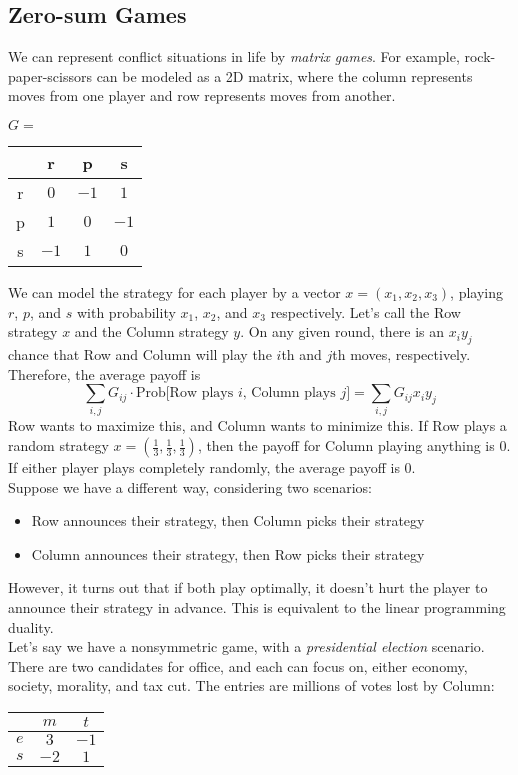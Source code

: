 \subsection{Zero-sum Games}
We can represent conflict situations in life by \textit{matrix games}.
For example, rock-paper-scissors can be modeled as a 2D matrix, where the column represents moves from one player and row represents moves from another.
\begin{center}
$G = $\begin{tabular}{c | c c c}
  & r & p & s \\
  \hline
  r & $0$ & $-1$ & $1$ \\
  p & $1$ & $0$ & $-1$\\
  s & $-1$ & $1$ & $0$
\end{tabular}
\end{center}
We can model the strategy for each player by a vector $x = (x_1, x_2, x_3)$, playing $r$, $p$, and $s$ with probability $x_{1}$, $x_{2}$, and $x_{3}$ respectively.
Let's call the Row strategy $x$ and the Column strategy $y$.
On any given round, there is an $x_i y_j$ chance that Row and Column will play the $i$th and $j$th moves, respectively.
Therefore, the average payoff is $$\sum_{i, j} G_{ij} \cdot \text{Prob[Row plays $i$, Column plays $j$]} = \sum_{i,j} G_{ij} x_i y_j$$
Row wants to maximize this, and Column wants to minimize this.
If Row plays a random strategy $x = (\frac{1}{3}, \frac{1}{3}, \frac{1}{3})$, then the payoff for Column playing anything is $0$.
If either player plays completely randomly, the average payoff is $0$.\\
Suppose we have a different way, considering two scenarios:
\begin{itemize}
  \item Row announces their strategy, then Column picks their strategy
  \item Column announces their strategy, then Row picks their strategy
\end{itemize}
However, it turns out that if both play optimally, it doesn't hurt the player to announce their strategy in advance.
This is equivalent to the linear programming duality.\\
Let's say we have a nonsymmetric game, with a \textit{presidential election} scenario.
There are two candidates for office, and each can focus on, either economy, society, morality, and tax cut.
The entries are millions of votes lost by Column:
\begin{center}
  \begin{tabular}{c | c c}
     & $m$ & $t$ \\
     \hline
    $e$ & $3$ & $-1$\\
    $s$ & $-2$ & $1$\\
  \end{tabular}
\end{center}
